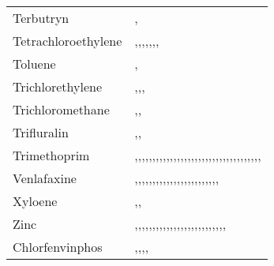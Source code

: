 \begin{tabular}{ll}
\cline{1-2}
Terbutryn & \cite{Ormad_2008},\cite{RAHMANI201882} \\
\cline{1-2}
Tetrachloroethylene & \cite{Mitra_2013},\cite{Tkachenko_2020},\cite{Mailler_2013},\cite{Sponza_2001},\cite{Bhattacharya_1996},\cite{Glaze_1987},\cite{ARZATE2020110265},\cite{Salehi2020-aa} \\
\cline{1-2}
Toluene & \cite{Shammay_2018},\cite{Mailler_2013} \\
\cline{1-2}
Trichlorethylene & \cite{ARZATE2020110265},\cite{Bhattacharya_1996},\cite{Tkachenko_2020},\cite{Mailler_2013} \\
\cline{1-2}
Trichloromethane & \cite{Samarghandi2007-uz},\cite{Shammay_2018},\cite{Mailler_2013} \\
\cline{1-2}
Trifluralin & \cite{Ormad_2008},\cite{RAHMANI201882},\cite{Teijon_2010} \\
\cline{1-2}
Trimethoprim & \cite{Liu_2015},\cite{Liu_2017},\cite{Ballesteros_C_novas_2015},\cite{Guillossou_2019},\cite{Kim_2009},\cite{Coutu_2013},\cite{Ortiz_de_Garc_a_2013},\cite{Kuang_2013},\cite{Cai_2018},\cite{Radjenovi__2009},\cite{GOBEL_2007},\cite{ter_Laak_2014},\cite{Hai_2020},\cite{Lebrun_2015},\cite{Tewari_2013},\cite{Omanovi__2015},\cite{Wu_2016},\cite{Krol_2015},\cite{Kuang2013-mo},\cite{Gracia_Lor_2012},\cite{Johnson_2017},\cite{Arzate_2020},\cite{Kaegi_2015},\cite{Escol_Casas_2015},\cite{Javid2020-ch},\cite{Plumlee_2012},\cite{Yan_2014},\cite{Novovic_2015},\cite{Mart_nez_Costa_2018},\cite{Zhang_2016},\cite{Yuan_2015},\cite{Marug_n_2020},\cite{Verlicchi_2014},\cite{Batt_2007},\cite{Carballa_2008},\cite{Meulepas_2015},\cite{K_mmerer_2003} \\
\cline{1-2}
Venlafaxine & \cite{Choubert2011-ic},\cite{Skees_2018},\cite{Lambropoulou_2017},\cite{R_a_G_mez_2011},\cite{Vazquez_Roig_2014},\cite{Giannakis_2017},\cite{GAROMA2010814},\cite{Teijon_2010},\cite{Lin_2021},\cite{ter_Laak_2014},\cite{Gorito_2021},\cite{Metcalfe_2009},\cite{Subedi_2017},\cite{Wu2022-sp},\cite{Gracia_Lor_2012},\cite{Arzate_2020},\cite{Subedi_2013},\cite{Subedi_2019},\cite{Escol_Casas_2015},\cite{Javid2020-ch},\cite{Casta_o_Trias_2020},\cite{Hollman_2018},\cite{Garc_a_Gal_n_2016},\cite{Schl_sener_2015},\cite{R_a_G_mez_2012} \\
\cline{1-2}
Xyloene & \cite{Shammay_2018},\cite{Ruan2019-vy},\cite{Mailler_2013} \\
\cline{1-2}
Zinc & \cite{Lester_1979},\cite{Wang_2021},\cite{da_Silva_Oliveira_2007},\cite{SORME_2002},\cite{Yoshida_2015},\cite{Feng_2018},\cite{Marzougui_2018},\cite{Orescanin_2013},\cite{Gupta_1998},\cite{Busetti_2005},\cite{Goldstone_1990},\cite{Choubert_2011},\cite{Stoveland_1979},\cite{Drozdova_2018},\cite{Brown_1973},\cite{Sterritt_1981},\cite{Hargreaves_2016},\cite{Nieminski_1995},\cite{Karvelas_2003},\cite{Lester_1983},\cite{Mansourri_2016},\cite{Mailler_2013},\cite{Zhou_2018},\cite{OLIVER_1974},\cite{Edokpayi_2015},\cite{Sudo_1973},\cite{Gardner_2013} \\
\cline{1-2}
Chlorfenvinphos & \cite{Stamatis_2010},\cite{RAHMANI201882},\cite{Ormad_2008},\cite{Hijosa_Valsero_2013},\cite{Tkachenko2020-sk} \\
\cline{1-2}
\end{tabular}
